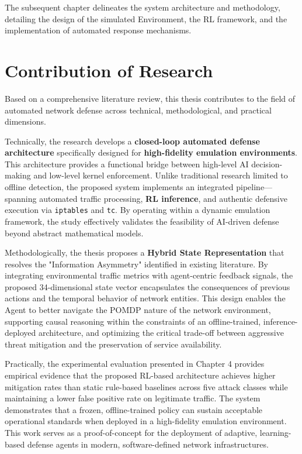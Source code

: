 \documentclass[12pt,a4paper]{report}
\begin{document}
The subsequent chapter delineates the system architecture and methodology, detailing the design of the simulated Environment, the RL framework, and the implementation of automated response mechanisms.

\section{Contribution of Research}

Based on a comprehensive literature review, this thesis contributes to the field of automated network defense across technical, methodological, and practical dimensions.

Technically, the research develops a \textbf{closed-loop automated defense architecture} specifically designed for \textbf{high-fidelity emulation environments}. This architecture provides a functional bridge between high-level AI decision-making and low-level kernel enforcement. Unlike traditional research limited to offline detection, the proposed system implements an integrated pipeline—spanning automated traffic processing, \textbf{RL inference}, and authentic defensive execution via \texttt{iptables} and \texttt{tc}. By operating within a dynamic emulation framework, the study effectively validates the feasibility of AI-driven defense beyond abstract mathematical models.

Methodologically, the thesis proposes a \textbf{Hybrid State Representation} that resolves the "Information Asymmetry" identified in existing literature. By integrating environmental traffic metrics with agent-centric feedback signals, the proposed 34-dimensional state vector encapsulates the consequences of previous actions and the temporal behavior of network entities. This design enables the Agent to better navigate the POMDP nature of the network environment, supporting causal reasoning within the constraints of an offline-trained, inference-deployed architecture, and optimizing the critical trade-off between aggressive threat mitigation and the preservation of service availability.

Practically, the experimental evaluation presented in Chapter 4 provides empirical evidence that the proposed RL-based architecture achieves higher mitigation rates than static rule-based baselines across five attack classes while maintaining a lower false positive rate on legitimate traffic. The system demonstrates that a frozen, offline-trained policy can sustain acceptable operational standards when deployed in a high-fidelity emulation environment. This work serves as a proof-of-concept for the deployment of adaptive, learning-based defense agents in modern, software-defined network infrastructures.
\end{document}
